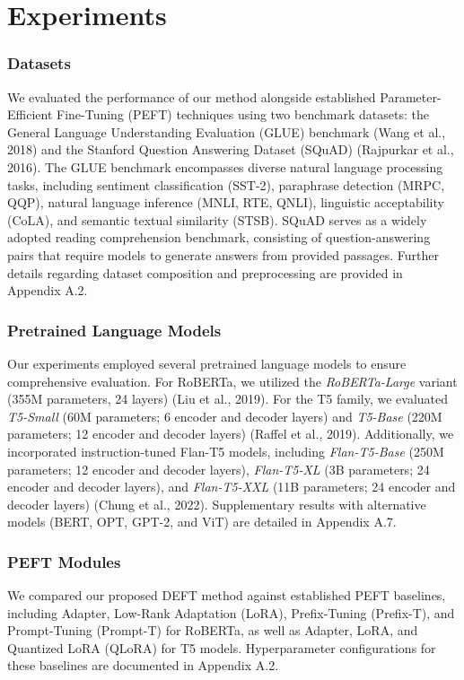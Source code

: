 \documentclass[conference]{IEEEtran}
\begin{document}
\section{Experiments}

\subsubsection*{Datasets}
We evaluated the performance of our method alongside established Parameter-Efficient Fine-Tuning (PEFT) techniques using two benchmark datasets: the General Language Understanding Evaluation (GLUE) benchmark (Wang et al., 2018) and the Stanford Question Answering Dataset (SQuAD) (Rajpurkar et al., 2016). The GLUE benchmark encompasses diverse natural language processing tasks, including sentiment classification (SST-2), paraphrase detection (MRPC, QQP), natural language inference (MNLI, RTE, QNLI), linguistic acceptability (CoLA), and semantic textual similarity (STSB). SQuAD serves as a widely adopted reading comprehension benchmark, consisting of question-answering pairs that require models to generate answers from provided passages. Further details regarding dataset composition and preprocessing are provided in Appendix A.2.
\subsubsection*{Pretrained Language Models}
Our experiments employed several pretrained language models to ensure comprehensive evaluation. For RoBERTa, we utilized the \textit{RoBERTa-Large} variant (355M parameters, 24 layers) (Liu et al., 2019). For the T5 family, we evaluated \textit{T5-Small} (60M parameters; 6 encoder and decoder layers) and \textit{T5-Base} (220M parameters; 12 encoder and decoder layers) (Raffel et al., 2019). Additionally, we incorporated instruction-tuned Flan-T5 models, including \textit{Flan-T5-Base} (250M parameters; 12 encoder and decoder layers), \textit{Flan-T5-XL} (3B parameters; 24 encoder and decoder layers), and \textit{Flan-T5-XXL} (11B parameters; 24 encoder and decoder layers) (Chung et al., 2022). Supplementary results with alternative models (BERT, OPT, GPT-2, and ViT) are detailed in Appendix A.7.
\subsubsection*{PEFT Modules}
We compared our proposed DEFT method against established PEFT baselines, including Adapter, Low-Rank Adaptation (LoRA), Prefix-Tuning (Prefix-T), and Prompt-Tuning (Prompt-T) for RoBERTa, as well as Adapter, LoRA, and Quantized LoRA (QLoRA) for T5 models. Hyperparameter configurations for these baselines are documented in Appendix A.2.
\end{document}
